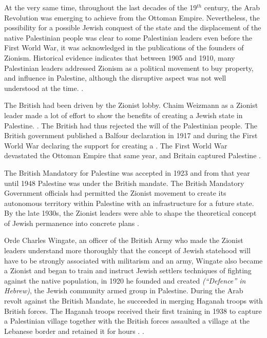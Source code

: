 At the very same time, throughout the last decades of the 19$^{th}$ century, the Arab Revolution was emerging to achieve  from the Ottoman Empire. Nevertheless, the possibility for a possible Jewish conquest of the state and the displacement of the native Palestinian people was clear to some Palestinian leaders even before the First World War, it was acknowledged in the publications of the founders of Zionism. Historical evidence indicates that between 1905 and 1910, many Palestinian leaders addressed Zionism as a political movement to buy property, and influence in Palestine, although the disruptive aspect was not well understood at the time. \citep{Pappe2006}.



The British had been driven by the Zionist lobby. Chaim Weizmann as a Zionist leader made a lot of effort to show the benefits of creating a Jewish state in Palestine.  \cite[p.10]{Morris2008}. The British had thus rejected the will of the Palestinian people. The British government published a Balfour declaration in 1917 and during the First World War declaring the support for creating a . The First World War devastated the Ottoman Empire that same year, and Britain captured Palestine \citep{Morris2004}.  
 
 
 
 
 
 The British Mandatory for Palestine was accepted in 1923 and from that year until 1948 Palestine was under the British mandate. The British Mandatory Government officials had permitted the Zionist movement to create its autonomous territory within Palestine with an infrastructure for a future state. By the late 1930s, the Zionist leaders were able to shape the theoretical concept of Jewish permanence into concrete plans \citep{Pappe2006}.  
 
Orde Charles Wingate, an officer of the British Army who made the Zionist leaders understand more thoroughly that the concept of Jewish statehood will have to be strongly associated with militarism and an army, Wingate also became a Zionist and began to train and instruct Jewish settlers techniques of fighting against the native population, in 1920 he founded and created  \textit{(“Defence” in Hebrew)}, the Jewish community armed group in Palestine. During the Arab revolt against the British Mandate, he succeeded in merging Haganah troops with British forces. The Haganah troops received their first training in 1938 to capture a Palestinian village together with the British forces assaulted a village at the Lebanese border and retained it for hours \citep{Pappe2006}. \cite [p.112]{Fenby2018}. 

